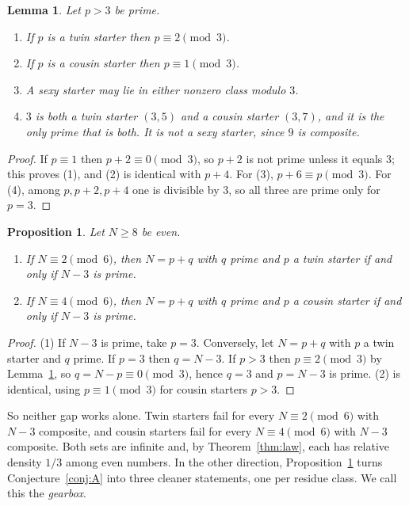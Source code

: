 \documentclass[11pt]{article}
\newtheorem{proposition}[theorem]{Proposition}
\newtheorem{lemma}[theorem]{Lemma}
\theoremstyle{definition}
\theoremstyle{remark}
\begin{document}
\begin{lemma}\label{lem:residues}
Let $p>3$ be prime.
\begin{enumerate}
\item If $p$ is a twin starter then $p\equiv 2\pmod 3$.
\item If $p$ is a cousin starter then $p\equiv 1\pmod 3$.
\item A sexy starter may lie in either nonzero class modulo $3$.
\item $3$ is both a twin starter $(3,5)$ and a cousin starter $(3,7)$, and it is
the only prime that is both. It is not a sexy starter, since $9$ is composite.
\end{enumerate}
\end{lemma}

\begin{proof}
If $p\equiv1$ then $p+2\equiv0\pmod 3$, so $p+2$ is not prime unless it equals $3$; this
proves (1), and (2) is identical with $p+4$. For (3), $p+6\equiv p\pmod 3$.
For (4), among $p,p+2,p+4$ one is divisible by $3$, so all three are prime only
for $p=3$.
\end{proof}

\begin{proposition}\label{prop:twinblock}
Let $N\ge 8$ be even.
\begin{enumerate}
\item If $N\equiv 2\pmod 6$, then $N=p+q$ with $q$ prime and $p$ a twin
starter if and only if $N-3$ is prime.
\item If $N\equiv 4\pmod 6$, then $N=p+q$ with $q$ prime and $p$ a cousin
starter if and only if $N-3$ is prime.
\end{enumerate}
\end{proposition}

\begin{proof}
(1) If $N-3$ is prime, take $p=3$. Conversely, let $N=p+q$ with $p$ a twin
starter and $q$ prime. If $p=3$ then $q=N-3$. If $p>3$ then
$p\equiv 2\pmod 3$ by Lemma~\ref{lem:residues}, so $q=N-p\equiv 0\pmod 3$, hence
$q=3$ and $p=N-3$ is prime. (2) is identical, using $p\equiv1\pmod3$ for
cousin starters $p>3$.
\end{proof}

So neither gap works alone. Twin starters fail for every $N\equiv 2\pmod 6$ with
$N-3$ composite, and cousin starters fail for every $N\equiv 4\pmod 6$ with
$N-3$ composite. Both sets are infinite and, by Theorem~\ref{thm:law}, each
has relative density $1/3$ among even numbers. In the other direction,
Proposition~\ref{prop:twinblock} turns Conjecture~\ref{conj:A} into three
cleaner statements, one per residue class. We call this the \emph{gearbox}.
\end{document}
